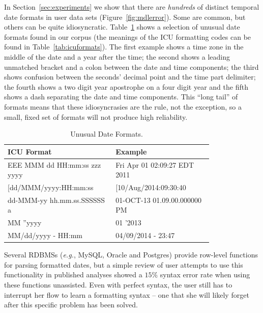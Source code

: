 In Section~\ref{sec:experiments} we show that there are \emph{hundreds} of distinct temporal date formats in user data sets (Figure~\ref{fig:mdlerror}).
Some are common, but others can be quite idiosyncratic. 
Table~\ref{tab:dateformats} shows a selection of unusual date formats found in our corpus (the meanings of the ICU formatting codes can be found in Table~\ref{tab:icuformats}). 
The first example shows a time zone in the middle of the date and a year after the time; 
the second shows a leading unmatched bracket and a colon between the date and time components; 
the third shows confusion between the seconds' decimal point and the time part delimiter; 
the fourth shows a two digit year apostrophe on a four digit year and the fifth shows a dash separating the date and time components. 
This ``long tail'' of formats means that these idiosyncrasies are the rule, not the exception, 
so a small, fixed set of formats will not produce high reliability.

\begin{table}[ht]
\centering
\bgroup
\def\arraystretch{1.5}
\begin{tabular}{|p{0.4\linewidth}| p{0.4\linewidth}|}
\hline
\centering
\textbf{ICU Format} & \textbf{Example}\\ \hline
\scriptsize{EEE MMM dd HH:mm:ss zzz yyyy} & \scriptsize{Fri Apr 01 02:09:27 EDT 2011}\\ \hline
\scriptsize{[dd/MMM/yyyy:HH:mm:ss} & \scriptsize{[10/Aug/2014:09:30:40}\\ \hline
\scriptsize{dd-MMM-yy hh.mm.ss.SSSSSS a} & \scriptsize{01-OCT-13 01.09.00.000000 PM}\\ \hline
\scriptsize{MM ''yyyy} & \scriptsize{01 '2013}\\ \hline
\scriptsize{MM/dd/yyyy - HH:mm} & \scriptsize{04/09/2014 - 23:47}\\ \hline
\end{tabular}
\egroup
\caption{Unusual Date Formats.}
\label{tab:dateformats}
\end{table}

Several RDBMSs (\textit{e.g.}, MySQL, Oracle and Postgres) provide row-level functions for parsing formatted dates, but a simple review of user attempts to use this functionality in published analyses showed a $15\%$ syntax error rate when using these functions unassisted. Even with perfect syntax, the user still has to interrupt her flow to learn a formatting syntax -- one that she will likely forget after this specific problem has been solved.

